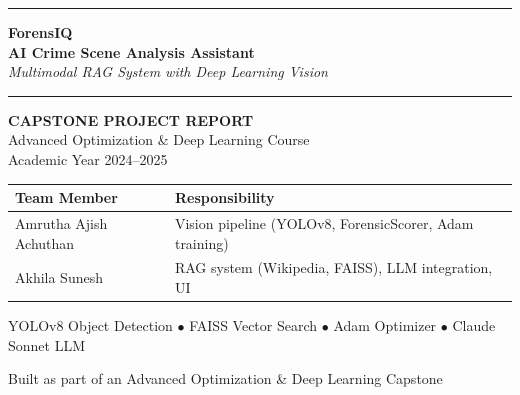 \documentclass[12pt,a4paper]{article}
\begin{document}
\begin{titlepage}
  \centering
  \vspace*{1.5cm}

  {\color{accent}\rule{\linewidth}{3pt}}
  \vspace{0.5cm}

  {\Huge\bfseries\color{primary} ForensIQ}\\[0.4cm]
  {\LARGE\bfseries AI Crime Scene Analysis Assistant}\\[0.3cm]
  {\large\itshape Multimodal RAG System with Deep Learning Vision}

  \vspace{0.4cm}
  {\color{accent}\rule{\linewidth}{1pt}}
  \vspace{1.2cm}

  \begin{mdframed}[backgroundcolor=lightgray, linecolor=primary, linewidth=1pt]
    \centering
    \vspace{0.3cm}
    {\normalsize\bfseries CAPSTONE PROJECT REPORT}\\[0.3cm]
    {\normalsize Advanced Optimization \& Deep Learning Course}\\[0.2cm]
    {\small Academic Year 2024--2025}
    \vspace{0.3cm}
  \end{mdframed}

  \vspace{1.5cm}

  \begin{tabular}{ll}
    \toprule
    \textbf{Team Member} & \textbf{Responsibility} \\
    \midrule
    Amrutha Ajish Achuthan & Vision pipeline (YOLOv8, ForensicScorer, Adam training) \\
    Akhila Sunesh          & RAG system (Wikipedia, FAISS), LLM integration, UI \\
    \bottomrule
  \end{tabular}

  \vspace{2cm}

  {\small\color{gray}
    YOLOv8 Object Detection \quad$\bullet$\quad
    FAISS Vector Search \quad$\bullet$\quad
    Adam Optimizer \quad$\bullet$\quad
    Claude Sonnet LLM
  }

  \vfill
  {\small\color{gray} Built as part of an Advanced Optimization \& Deep Learning Capstone}
\end{titlepage}
\end{document}
